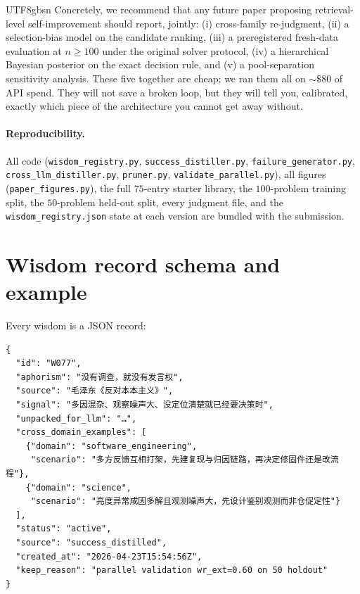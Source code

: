 \documentclass{article}
\begin{document}
\begin{CJK*}{UTF8}{gbsn}
Concretely, we recommend that any future paper proposing
retrieval-level self-improvement should report, jointly: (i)
cross-family re-judgment, (ii) a selection-bias model on the
candidate ranking, (iii) a preregistered fresh-data evaluation
at \(n \geq 100\) under the original solver protocol, (iv) a
hierarchical Bayesian posterior on the exact decision rule, and
(v) a pool-separation sensitivity analysis. These five together
are cheap; we ran them all on \({\sim}\$80\) of API spend. They
will not save a broken loop, but they will tell you, calibrated,
exactly which piece of the architecture you cannot get away
without.

\paragraph{Reproducibility.} All code
(\texttt{wisdom\_registry.py}, \texttt{success\_distiller.py},
\texttt{failure\_generator.py}, \texttt{cross\_llm\_distiller.py},
\texttt{pruner.py}, \texttt{validate\_parallel.py}), all figures
(\texttt{paper\_figures.py}), the full \(75\)-entry starter library,
the \(100\)-problem training split, the \(50\)-problem held-out
split, every judgment file, and the \texttt{wisdom\_registry.json}
state at each version are bundled with the submission.




\appendix

\section{Wisdom record schema and example}
\label{app:schema}

Every wisdom is a JSON record:
\begin{verbatim}
{
  "id": "W077",
  "aphorism": "没有调查，就没有发言权",
  "source": "毛泽东《反对本本主义》",
  "signal": "多因混杂、观察噪声大、没定位清楚就已经要决策时",
  "unpacked_for_llm": "…",
  "cross_domain_examples": [
    {"domain": "software_engineering",
     "scenario": "多方反馈互相打架，先建复现与归因链路，再决定修固件还是改流程"},
    {"domain": "science",
     "scenario": "亮度异常成因多解且观测噪声大，先设计鉴别观测而非仓促定性"}
  ],
  "status": "active",
  "source": "success_distilled",
  "created_at": "2026-04-23T15:54:56Z",
  "keep_reason": "parallel validation wr_ext=0.60 on 50 holdout"
}
\end{verbatim}


\end{CJK*}
\end{document}

